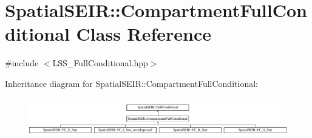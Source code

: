 \hypertarget{classSpatialSEIR_1_1CompartmentFullConditional}{\section{Spatial\-S\-E\-I\-R\-:\-:Compartment\-Full\-Conditional Class Reference}
\label{classSpatialSEIR_1_1CompartmentFullConditional}
}


{\ttfamily \#include $<$L\-S\-S\-\_\-\-Full\-Conditional.\-hpp$>$}

Inheritance diagram for Spatial\-S\-E\-I\-R\-:\-:Compartment\-Full\-Conditional\-:\begin{figure}[H]
\begin{center}
\leavevmode
\includegraphics[height=1.693548cm]{classSpatialSEIR_1_1CompartmentFullConditional}
\end{center}
\end{figure}
